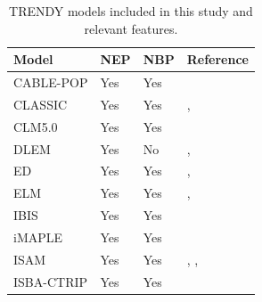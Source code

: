 \documentclass[10pt]{article}
\begin{document}
\begin{table}[!ht]
\centering
\label{Tab:TRENDYmodels}
\caption{TRENDY models included in this study and relevant features.}
\begin{tabular}{llll}
\textbf{Model} & \textbf{NEP} & \textbf{NBP} & \textbf{Reference}                                                                                                                  \\ \hline
CABLE-POP      & Yes          & Yes          &  \cite{Haverd2018}                                                                                                                \\
CLASSIC        & Yes          & Yes          & \cite{Melton2020}, \cite{Asaadi2018}                                                                                                               \\
CLM5.0         & Yes          & Yes          & \cite{Lawrence2019}                                                                                                              \\
DLEM           & Yes          & No           & \cite{Tian2015}, \cite{You2022}                                                                                               \\
ED             & Yes          & Yes          & \cite{Moorcroft2001}, \cite{Ma2022}                                                                                           \\
ELM            & Yes          & Yes          & \cite{Yang2023}, \cite{Burrows2020}                                                                                            \\
IBIS           & Yes          & Yes          & \cite{Xia2024}                                                                                                                   \\
iMAPLE         & Yes          & Yes          & \cite{Yue2024}                                                                                                                   \\
ISAM           & Yes          & Yes          & \cite{Jain2013}, \cite{Meiyappan2015}, \cite{Shu2020}                            \\
ISBA-CTRIP& Yes          & Yes          & \cite{Delire2020}                                                                                                               \\

\end{tabular}
\end{table}
\end{document}
